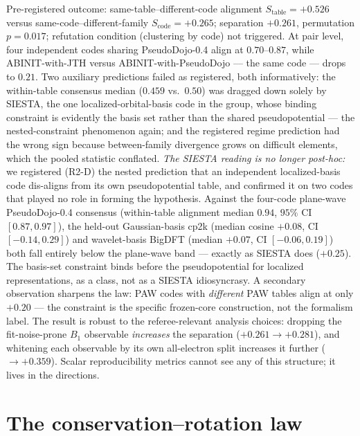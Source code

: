 \documentclass[11pt]{article}
\theoremstyle{remark}
\begin{document}
Pre-registered outcome: same-table--different-code alignment
$S_{\mathrm{table}} = +0.526$ versus same-code--different-family
$S_{\mathrm{code}} = +0.265$; separation $+0.261$, permutation $p = 0.017$;
refutation condition (clustering by code) not triggered. At pair level, four
independent codes sharing PseudoDojo-0.4 align at $0.70$--$0.87$, while
ABINIT-with-JTH versus ABINIT-with-PseudoDojo --- the same code --- drops to
$0.21$. Two auxiliary predictions failed as registered, both informatively:
the within-table consensus median ($0.459$ vs.\ $0.50$) was dragged down
solely by SIESTA, the one localized-orbital-basis code in the group, whose
binding constraint is evidently the basis set rather than the shared
pseudopotential --- the nested-constraint phenomenon again; and the registered
regime prediction had the wrong sign because between-family divergence grows
on difficult elements, which the pooled statistic conflated. \emph{The SIESTA
reading is no longer post-hoc:} we registered (R2-D) the nested prediction that
an independent localized-basis code dis-aligns from its own pseudopotential
table, and confirmed it on two codes that played no role in forming the
hypothesis. Against the four-code plane-wave PseudoDojo-0.4 consensus (within-table
alignment median $0.94$, $95\%$ CI $[0.87, 0.97]$), the held-out Gaussian-basis
cp2k (median cosine $+0.08$, CI $[-0.14, 0.29]$) and wavelet-basis BigDFT
(median $+0.07$, CI $[-0.06, 0.19]$) both fall entirely below the plane-wave
band --- exactly as SIESTA does ($+0.25$). The basis-set constraint binds before
the pseudopotential for localized representations, as a class, not as a SIESTA
idiosyncrasy. A secondary
observation sharpens the law: PAW codes with \emph{different} PAW tables align
at only $+0.20$ --- the constraint is the specific frozen-core construction,
not the formalism label. The result is robust to the referee-relevant
analysis choices: dropping the fit-noise-prone $B_1$ observable
\emph{increases} the separation ($+0.261 \to +0.281$), and whitening each
observable by its own all-electron split increases it further ($\to +0.359$).
Scalar reproducibility metrics
\citep{lejaeghere2016,bosoni2024} cannot see any of this structure; it lives
in the directions.

\section{The conservation--rotation law}
\label{sec:law}
\end{document}
